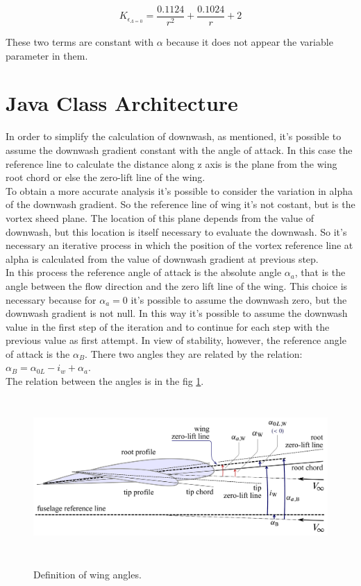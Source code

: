 \begin{equation}
K_{\epsilon _{\Lambda=0}} = \frac{ 0.1124 }{r^2} + \frac{0.1024}{r} +2
\end{equation}

These two terms are constant with $\alpha$ because  it does not appear the variable parameter in them.


\section{Java Class Architecture}

In order to simplify the calculation of downwash, as mentioned, it's possible to assume the downwash gradient constant with the angle of attack. In this case the reference line to calculate the distance along z axis is the plane from the wing root chord or else the zero-lift line of the wing.\\
To obtain a more accurate analysis it's possible to consider the variation in alpha of the downwash gradient. So the reference line of wing it's not costant, but is the vortex sheed plane. The location of this plane depends from the value of downwash, but this location is itself necessary to evaluate the downwash. So it's necessary an iterative process in which the position of the vortex reference line at alpha is calculated from the value of downwash gradient at previous step.\\ 

In this process the reference angle of attack is the absolute angle $\alpha_a$, that is the angle between the flow direction and the zero lift line of the wing. This choice is necessary because for $\alpha_a = 0$ it's possible to assume the downwash zero, but the downwash gradient is not null. In this way it's possible to assume the downwash value in the first step of the iteration and to continue for each step with the previous value as first attempt.
In view of stability, however, the reference angle of attack is the $\alpha_B$. There two angles they are related by the relation: $ \alpha_B =\alpha_{0L} - i_w + \alpha_a $. \\The relation between the angles is in the fig \ref{anglesDef}.

\begin{figure}[H]
\centering
{\includegraphics[height=6cm]{Immagini/Wing_Alpha_Zero_List.pdf}} 
\caption{Definition of wing angles.}
\label{anglesDef}
\end{figure} 


